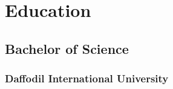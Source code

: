 \section{Education} 

\subsection{Bachelor of Science}
\subsubsection*{Daffodil International University}


\sectionspace %
